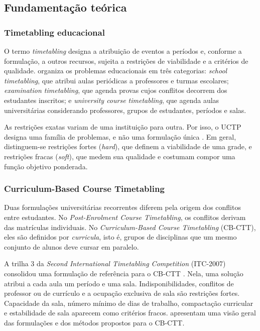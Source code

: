 \subsection{Fundamentação teórica}
\label{subsec:fundamentacao}

\subsubsection{Timetabling educacional}

O termo \textit{timetabling} designa a atribuição de eventos a períodos e, conforme a formulação, a outros recursos, sujeita a restrições de viabilidade e a critérios de qualidade.  organiza os problemas educacionais em três categorias: \textit{school timetabling}, que atribui aulas periódicas a professores e turmas escolares; \textit{examination timetabling}, que agenda provas cujos conflitos decorrem dos estudantes inscritos; e \textit{university course timetabling}, que agenda aulas universitárias considerando professores, grupos de estudantes, períodos e salas.

As restrições exatas variam de uma instituição para outra. Por isso, o UCTP designa uma família de problemas, e não uma formulação única \cite{lewis2008survey,babaei2015survey}. Em geral, distinguem-se restrições fortes (\textit{hard}), que definem a viabilidade de uma grade, e restrições fracas (\textit{soft}), que medem sua qualidade e costumam compor uma função objetivo ponderada.

\subsubsection{Curriculum-Based Course Timetabling}

Duas formulações universitárias recorrentes diferem pela origem dos conflitos entre estudantes. No \textit{Post-Enrolment Course Timetabling}, os conflitos derivam das matrículas individuais. No \textit{Curriculum-Based Course Timetabling} (CB-CTT), eles são definidos por \textit{curricula}, isto é, grupos de disciplinas que um mesmo conjunto de alunos deve cursar em paralelo.

A trilha 3 da \textit{Second International Timetabling Competition} (ITC-2007) consolidou uma formulação de referência para o CB-CTT \cite{digaspero2007itc}. Nela, uma solução atribui a cada aula um período e uma sala. Indisponibilidades, conflitos de professor ou de currículo e a ocupação exclusiva de sala são restrições fortes. Capacidade da sala, número mínimo de dias de trabalho, compactação curricular e estabilidade de sala aparecem como critérios fracos.  apresentam uma visão geral das formulações e dos métodos propostos para o CB-CTT.

